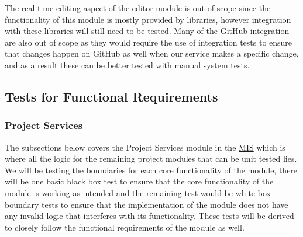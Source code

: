 \documentclass[12pt, titlepage]{article}
\begin{document}
	The real time editing aspect of the editor module is out of scope since the functionality of this module is mostly provided by libraries, however integration with these libraries will still need to be tested. Many of the GitHub integration are also out of scope as they would require the use of integration tests to ensure that changes happen on GitHub as well when our service makes a specific change, and as a result these can be better tested with manual system tests.
	
	\subsection{Tests for Functional Requirements}
	
	\subsubsection{Project Services}
	
	The subsections below covers the Project Services module in the \href{https://github.com/RutheniumVI/UnderTree/blob/main/docs/Design/MIS/MIS.pdf}{MIS} which is where all the logic for the remaining project modules that can be unit tested lies. We will be testing the boundaries for each core functionality of the module, there will be one basic black box test to ensure that the core functionality of the module is working as intended and the remaining test would be white box boundary tests to ensure that the implementation of the module does not have any invalid logic that interferes with its functionality. These tests will be derived to closely follow the functional requirements of the module as well.
	
\end{document}
